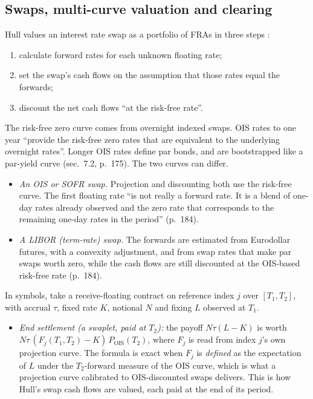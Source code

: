 \subsection{Swaps, multi-curve valuation and clearing}

\begin{qfmodel}\label{mod:multi-curve-fra-swap-valuation}
 Hull values an interest rate swap as a portfolio of FRAs in three steps \citep[chap.~7, sec.~7.6, pp.~183--185]{s7-hulloptions}:
\begin{enumerate}
\item calculate forward rates for each unknown floating rate;
\item set the swap's cash flows on the assumption that those rates equal the forwards;
\item discount the net cash flows ``at the risk-free rate''.
\end{enumerate}
The risk-free zero curve comes from overnight indexed swaps. OIS rates to one year ``provide the risk-free zero rates that are equivalent to the underlying overnight rates''. Longer OIS rates define par bonds, and are bootstrapped like a par-yield curve (sec.~7.2, p.~175). The two curves can differ.
\begin{itemize}
\item \emph{An OIS or SOFR swap.} Projection and discounting both use the risk-free curve. The first floating rate ``is not really a forward rate. It is a blend of one-day rates already observed and the zero rate that corresponds to the remaining one-day rates in the period'' (p.~184).
\item \emph{A LIBOR (term-rate) swap.} The forwards are estimated from Eurodollar futures, with a convexity adjustment, and from swap rates that make par swaps worth zero, while the cash flows are still discounted at the OIS-based risk-free rate (p.~184).
\end{itemize}
In symbols, take a receive-floating contract on reference index $j$ over $[T_1,T_2]$, with accrual $\tau$, fixed rate $K$, notional $N$ and fixing $L$ observed at $T_1$.
\begin{itemize}
\item \emph{End settlement (a swaplet, paid at $T_2$):} the payoff $N\tau(L-K)$ is worth $N\tau\,(F_j(T_1,T_2)-K)\,P_{\mathrm{OIS}}(T_2)$, where $F_j$ is read from index $j$'s own projection curve. The formula is exact when $F_j$ is \emph{defined} as the expectation of $L$ under the $T_2$-forward measure of the OIS curve, which is what a projection curve calibrated to OIS-discounted swaps delivers. This is how Hull's swap cash flows are valued, each paid at the end of its period.

\end{itemize}
\end{qfmodel}
